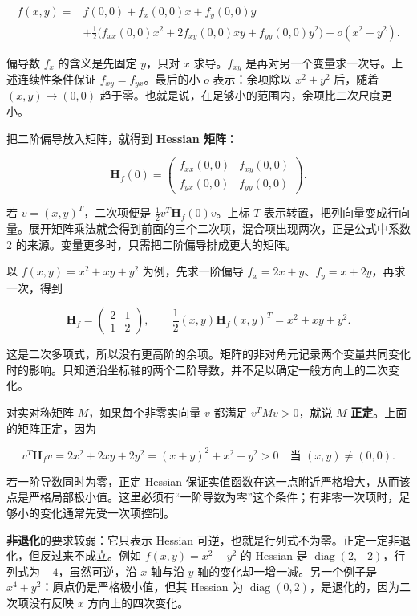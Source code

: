 \documentclass[11pt,a4paper]{article}
\begin{document}
\[\begin{aligned}
f(x,y)={}&f(0,0)+f_x(0,0)x+f_y(0,0)y\\
&+\frac12\bigl(f_{xx}(0,0)x^2
+2f_{xy}(0,0)xy+f_{yy}(0,0)y^2\bigr)
+o(x^2+y^2).
\end{aligned}\]

偏导数 \(f_x\) 的含义是先固定 \(y\)，只对 \(x\) 求导。\(f_{xy}\) 是再对另一个变量求一次导。上述连续性条件保证 \(f_{xy}=f_{yx}\)。最后的小 \(o\) 表示：余项除以 \(x^2+y^2\) 后，随着 \((x,y)\to(0,0)\) 趋于零。也就是说，在足够小的范围内，余项比二次尺度更小。

把二阶偏导放入矩阵，就得到 \textbf{Hessian 矩阵}：

\[\mathbf H_f(0)=
\begin{pmatrix}
f_{xx}(0,0)&f_{xy}(0,0)\\
f_{yx}(0,0)&f_{yy}(0,0)
\end{pmatrix}.\]

若 \(v=(x,y)^T\)，二次项便是 \(\tfrac12v^T\mathbf H_f(0)v\)。上标 \(T\) 表示转置，把列向量变成行向量。展开矩阵乘法就会得到前面的三个二次项，混合项出现两次，正是公式中系数 \(2\) 的来源。变量更多时，只需把二阶偏导排成更大的矩阵。

以 \(f(x,y)=x^2+xy+y^2\) 为例，先求一阶偏导 \(f_x=2x+y\)、\(f_y=x+2y\)，再求一次，得到

\[\mathbf H_f=
\begin{pmatrix}2&1\\1&2\end{pmatrix},\qquad
\frac12(x,y)\mathbf H_f(x,y)^T=x^2+xy+y^2.\]

这是二次多项式，所以没有更高阶的余项。矩阵的非对角元记录两个变量共同变化时的影响。只知道沿坐标轴的两个二阶导数，并不足以确定一般方向上的二次变化。

对实对称矩阵 \(M\)，如果每个非零实向量 \(v\) 都满足 \(v^TMv>0\)，就说 \(M\) \textbf{正定}。上面的矩阵正定，因为

\[v^T\mathbf H_fv
=2x^2+2xy+2y^2=(x+y)^2+x^2+y^2>0
\quad\text{当 }(x,y)\ne(0,0).\]

若一阶导数同时为零，正定 Hessian 保证实值函数在这一点附近严格增大，从而该点是严格局部极小值。这里必须有``一阶导数为零''这个条件；有非零一次项时，足够小的变化通常先受一次项控制。

\textbf{非退化}的要求较弱：它只表示 Hessian 可逆，也就是行列式不为零。正定一定非退化，但反过来不成立。例如 \(f(x,y)=x^2-y^2\) 的 Hessian 是 \(\operatorname{diag}(2,-2)\)，行列式为 \(-4\)，虽然可逆，沿 \(x\) 轴与沿 \(y\) 轴的变化却一增一减。另一个例子是 \(x^4+y^2\)：原点仍是严格极小值，但其 Hessian 为 \(\operatorname{diag}(0,2)\)，是退化的，因为二次项没有反映 \(x\) 方向上的四次变化。
\end{document}

